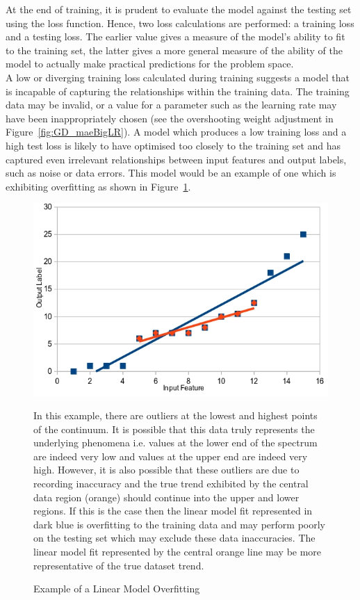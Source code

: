 \noindent
At the end of training, it is prudent to evaluate the model against the testing set using the loss function. Hence, two loss calculations are performed: a training loss and a testing loss. The earlier value gives a measure of the model's ability to fit to the training set, the latter gives a more general measure of the ability of the model to actually make practical predictions for the problem space. \\

\noindent
A low or diverging training loss calculated during training suggests a model that is incapable of capturing the relationships within the training data. The training data may be invalid, or a value for a parameter such as the learning rate may have been inappropriately chosen (see the overshooting weight adjustment in Figure~\ref{fig:GD_maeBigLR}). A model which produces a low training loss and a high test loss is likely to have optimised too closely to the training set and has captured even irrelevant relationships between input features and output labels, such as noise or data errors. This model would be an example of one which is exhibiting overfitting \cite{ying2019overview} as shown in Figure~\ref{fig:overfitting}. \\

\begin{figure}[h]
	\centering
	\includegraphics[scale=0.45]{Figures/overfitting.jpg}
	\caption{Example of a Linear Model Overfitting} {In this example, there are outliers at the lowest and highest points of the continuum.  It is possible that this data truly represents the underlying phenomena i.e. values at the lower end of the spectrum are indeed very low and values at the upper end are indeed very high. However, it is also possible that these outliers are due to recording inaccuracy and the true trend exhibited by the central data region (orange) should continue into the upper and lower regions. If this is the case then the linear model fit represented in dark blue is overfitting to the training data and may perform poorly on the testing set which may exclude these data inaccuracies. The linear model fit represented by the central orange line may be more representative of the true dataset trend.}
	\label{fig:overfitting}
\end{figure}
		
